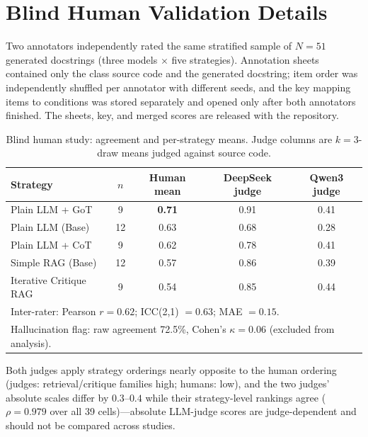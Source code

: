 \documentclass[pdflatex,sn-mathphys-ay]{sn-jnl}%
\theoremstyle{thmstyleone}%
\theoremstyle{thmstyletwo}%
\theoremstyle{thmstylethree}%
\begin{document}
{\color{blue}
\section{Blind Human Validation Details}
\label{app:human-validation}
Two annotators independently rated the same stratified sample of $N{=}51$ generated docstrings (three models $\times$ five strategies). Annotation sheets contained only the class source code and the generated docstring; item order was independently shuffled per annotator with different seeds, and the key mapping items to conditions was stored separately and opened only after both annotators finished. The sheets, key, and merged scores are released with the repository.

\begin{table}[h]
\centering
\small
\caption{Blind human study: agreement and per-strategy means. Judge columns are $k{=}3$-draw means judged against source code.}
\label{tab:blind-details}
\begin{tabular}{lcccc}
\toprule
\textbf{Strategy} & \textbf{$n$} & \textbf{Human mean} & \textbf{DeepSeek judge} & \textbf{Qwen3 judge} \\
\midrule
Plain LLM + GoT        & 9  & \textbf{0.71} & 0.91 & 0.41 \\
Plain LLM (Base)       & 12 & 0.63 & 0.68 & 0.28 \\
Plain LLM + CoT        & 9  & 0.62 & 0.78 & 0.41 \\
Simple RAG (Base)      & 12 & 0.57 & 0.86 & 0.39 \\
Iterative Critique RAG & 9  & 0.54 & 0.85 & 0.44 \\
\midrule
\multicolumn{5}{l}{Inter-rater: Pearson $r=0.62$; ICC(2,1) $=0.63$; MAE $=0.15$.} \\
\multicolumn{5}{l}{Hallucination flag: raw agreement 72.5\%, Cohen's $\kappa=0.06$ (excluded from analysis).} \\
\bottomrule
\end{tabular}
\end{table}

Both judges apply strategy orderings nearly opposite to the human ordering (judges: retrieval/critique families high; humans: low), and the two judges' absolute scales differ by $0.3$--$0.4$ while their strategy-level rankings agree ($\rho=0.979$ over all 39 cells)---absolute LLM-judge scores are judge-dependent and should not be compared across studies.

}
\end{document}
